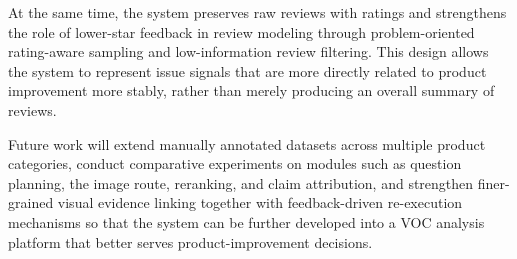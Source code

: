\documentclass[11pt]{article}
\begin{document}
At the same time, the system preserves raw reviews with ratings and strengthens the role of lower-star feedback in review modeling through problem-oriented rating-aware sampling and low-information review filtering. This design allows the system to represent issue signals that are more directly related to product improvement more stably, rather than merely producing an overall summary of reviews.

Future work will extend manually annotated datasets across multiple product categories, conduct comparative experiments on modules such as question planning, the image route, reranking, and claim attribution, and strengthen finer-grained visual evidence linking together with feedback-driven re-execution mechanisms so that the system can be further developed into a VOC analysis platform that better serves product-improvement decisions.



\end{document}
